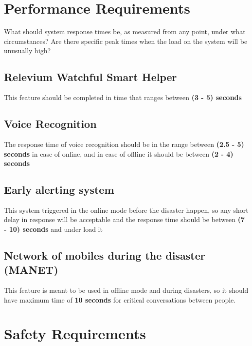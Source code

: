 \documentclass{scrreprt}
\begin{document}
\section{Performance Requirements}
What should system response times be, as measured from any point, under what circumstances?
Are there specific peak times when the load on the system will be unusually high?

\subsection{Relevium Watchful Smart Helper}
This feature should be completed in time that ranges between \textbf{(3 - 5) seconds}


\subsection{Voice Recognition}
The response time of voice recognition should be in the range between \textbf{(2.5 - 5) seconds} in case of online, and in case of offline it should be between \textbf{(2 - 4) seconds}

\subsection{Early alerting system}
This system triggered in the online mode before the disaster happen, so any short delay in response will
be acceptable and the response time should be between \textbf{(7 - 10) seconds} and under load it 

\subsection{Network of mobiles during the disaster (MANET)}
This feature is meant to be used in offline mode and during disasters, so it should have maximum time of \textbf{10 seconds} for critical conversations between people.

\newpage

\section{Safety Requirements}
\end{document}
